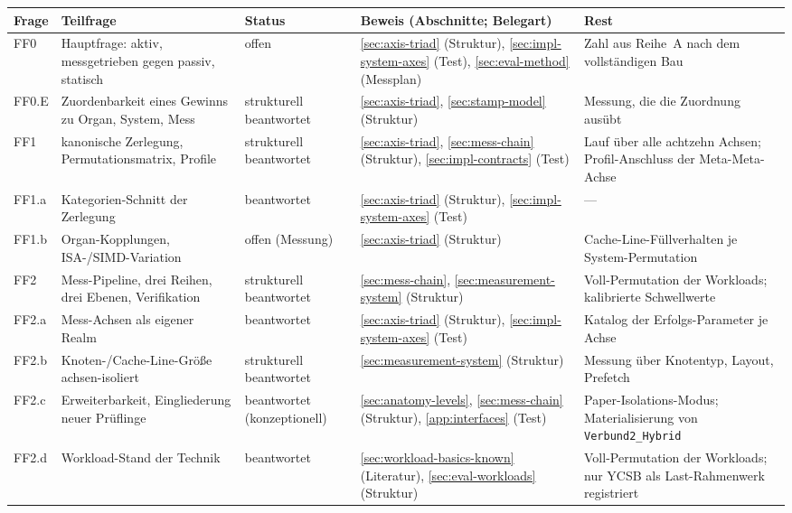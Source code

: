 \begin{table}[htbp]\centering\footnotesize
\begin{tabular}{@{}>{\raggedright\arraybackslash}p{0.9cm}>{\raggedright\arraybackslash}p{3.0cm}>{\raggedright\arraybackslash}p{2.0cm}>{\raggedright\arraybackslash}p{4.8cm}>{\raggedright\arraybackslash}p{3.3cm}@{}}
\toprule
Frage & Teilfrage & Status & Beweis (Abschnitte; Belegart) & Rest \\
\midrule
FF0 & Hauptfrage: aktiv, messgetrieben gegen passiv, statisch & offen & {\ref{sec:axis-triad}} (Struktur), {\ref{sec:impl-system-axes}} (Test), {\ref{sec:eval-method}} (Messplan) & Zahl aus Reihe~A nach dem vollständigen Bau \\
FF0.E & Zuordenbarkeit eines Gewinns zu Organ, System, Mess & strukturell beantwortet & {\ref{sec:axis-triad}}, {\ref{sec:stamp-model}} (Struktur) & Messung, die die Zuordnung ausübt \\
FF1 & kanonische Zerlegung, Permutationsmatrix, Profile & strukturell beantwortet & {\ref{sec:axis-triad}}, {\ref{sec:mess-chain}} (Struktur), {\ref{sec:impl-contracts}} (Test) & Lauf über alle achtzehn Achsen; Profil-Anschluss der Meta-Meta-Achse \\
FF1.a & Kategorien-Schnitt der Zerlegung & beantwortet & {\ref{sec:axis-triad}} (Struktur), {\ref{sec:impl-system-axes}} (Test) & --- \\
FF1.b & Organ-Kopplungen, ISA-/SIMD-Variation & offen (Messung) & {\ref{sec:axis-triad}} (Struktur) & Cache-Line-Füllverhalten je System-Permutation \\
FF2 & Mess-Pipeline, drei Reihen, drei Ebenen, Verifikation & strukturell beantwortet & {\ref{sec:mess-chain}}, {\ref{sec:measurement-system}} (Struktur) & Voll-Permutation der Workloads; kalibrierte Schwellwerte \\
FF2.a & Mess-Achsen als eigener Realm & beantwortet & {\ref{sec:axis-triad}} (Struktur), {\ref{sec:impl-system-axes}} (Test) & Katalog der Erfolgs-Parameter je Achse \\
FF2.b & Knoten-/Cache-Line-Größe achsen-isoliert & strukturell beantwortet & {\ref{sec:measurement-system}} (Struktur) & Messung über Knotentyp, Layout, Prefetch \\
FF2.c & Erweiterbarkeit, Eingliederung neuer Prüflinge & beantwortet (konzeptionell) & {\ref{sec:anatomy-levels}}, {\ref{sec:mess-chain}} (Struktur), {\ref{app:interfaces}} (Test) & Paper-Isolations-Modus; Materialisierung von \texttt{Verbund2\_Hybrid} \\
FF2.d & Workload-Stand der Technik & beantwortet & {\ref{sec:workload-basics-known}} (Literatur), {\ref{sec:eval-workloads}} (Struktur) & Voll-Permutation der Workloads; nur YCSB als Last-Rahmenwerk registriert \\

\end{tabular}
\end{table}
